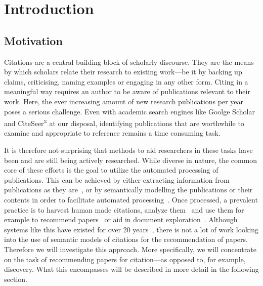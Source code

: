 \chapter{Introduction}\label{chap:introduction}
\section{Motivation}
Citations are a central building block of scholarly discourse. They are the means by which scholars relate their research to existing work---be it by backing up claims, criticising, naming examples or engaging in any other form. Citing in a meaningful way requires an author to be aware of publications relevant to their work.
Here, the ever increasing amount of new research publications per year poses a serious challenge. Even with academic search engines like Goolge Scholar and CiteSeer\textsuperscript{x} at our disposal, identifying publications that are worthwhile to examine and appropriate to reference remains a time consuming task.

It is therefore not surprising that methods to aid researchers in these tasks have been and are still being actively researched. While diverse in nature, the common core of these efforts is the goal to utilize the automated processing of publications. This can be achieved by either extracting information from publications as they are~\cite{Nasar2018,Beel2016}, or by semantically modelling the publications or their contents in order to facilitate automated processing~\cite{BuckinghamShum2000,Peroni2012,Huh2014,Jaradeh2019}. %
Once processed, a prevalent practice is to harvest human made citations, analyze them~\cite{Abujbara2013,Teufel2006a} and use them for example to recommend papers~\cite{Beel2016} or aid in document exploration~\cite{Berger2016}. Although systems like this have existed for over 20 years~\cite{Bollacker1998,Beel2016}, there is not a lot of work looking into the use of semantic models of citations for the recommendation of papers.
Therefore we will investigate this approach. More specifically, we will concentrate on the task of recommending papers for citation---as opposed to, for example, discovery. What this encompasses will be described in more detail in the following section.

